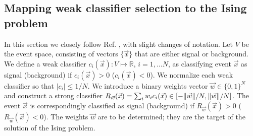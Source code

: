 \subsection{Mapping weak classifier selection to the Ising problem}
In this section we closely follow Ref. \cite{Pudenz:2013kx}, with slight changes of notation. Let $V$ be the event space, consisting of vectors $\{\vec{x}\}$ that are either signal or background. We define a weak classifier $c_i(\vec{x}):V\mapsto \mathbb{R}$, $i=1,\dots N$, as classifying event $\vec{x}$ as signal (background) if $c_i(\vec{x})>0$ ($c_i(\vec{x})<0$). We normalize each weak classifier so that $|c_i|\leq 1/N$. We introduce a binary weights vector $\vec{w} \in \{0,1\}^N$ and construct a strong classifier $R_{\vec{w}}(\vec{x}) = \sum_i w_i c_i(\vec{x})\in[-{\norm{\vec{w}}}/{N},{\norm{\vec{w}}}/{N}]$. The event $\vec{x}$ is correspondingly classified as signal (background) if $R_{\vec{w}}(\vec{x})>0$ ($R_{\vec{w}}(\vec{x})<0$). The weights $\vec{w}$ are to be determined; they are the target of the solution of the Ising problem.

